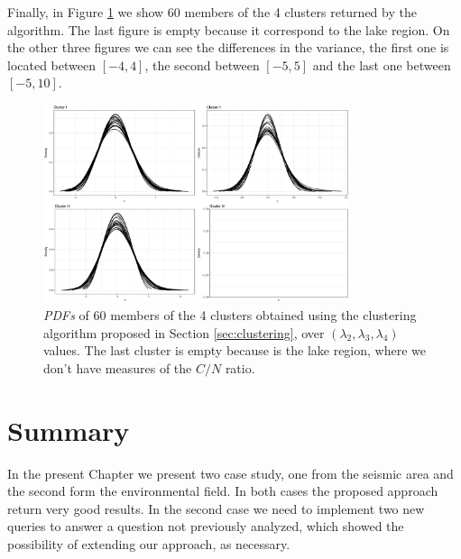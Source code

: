 Finally, in Figure \ref{fig:clusters_suq2} we show 60 members of the 4 clusters returned by the algorithm. The last figure is empty because it correspond to the lake region. On the other three figures we can see the differences in the variance, the first one is located between $[-4, 4]$, the second between $[-5, 5]$ and the last one between $[-5, 10]$.

\begin{figure}[H]
    \centering
    \includegraphics[width=0.8\textwidth]{img/use_cases/spus/clusters.eps}
    \caption{\textit{PDFs} of 60 members of the 4 clusters obtained using the clustering algorithm proposed in Section \ref{sec:clustering}, over $(\lambda_{2}, \lambda_{3}, \lambda_{4})$ values. The last cluster is empty because is the lake region, where we don't have measures of the $C/N$ ratio.}
    \label{fig:clusters_suq2}
\end{figure}

\section{Summary}\label{sec:use_case_summary}
In the present Chapter we present two case study, one from the seismic area and the second form the environmental field. In both cases the proposed approach return very good results. In the second case we need to implement two new queries to answer a question not previously analyzed, which showed the possibility of extending our approach, as necessary.
